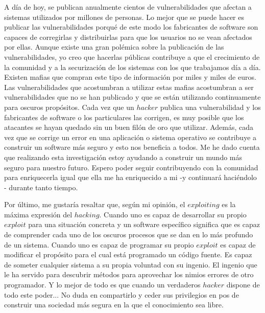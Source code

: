 \documentclass [titlepage, 12pt]{article}
\begin{document}
A d\'ia de hoy, se publican anualmente cientos de vulnerabilidades que afectan a sistemas utilizados por millones de personas. Lo mejor que se puede hacer es publicar las vulnerabilidades porqu\'e de este modo los fabricantes de software son capaces de corregirlas y distribuirlas para que los usuarios no se vean afectados por ellas. Aunque existe una gran pol\'emica sobre la publicaci\'on de las vulnerabilidades, yo creo que hacerlas p\'ublicas contribuye a que el crecimiento de la comunidad y a la securizaci\'on de los sistemas con los que trabajamos d\'ia a d\'ia.\\
Existen mafias que compran este tipo de informaci\'on por miles y miles de euros. Las vulnerabilidades que acostumbran a utilizar estas mafias acostumbran a ser vulnerabilidades que no se han publicado y que se est\'an utilizando continuamente para oscuros prop\'ositos. Cada vez que un $hacker$ publica una vulnerabilidad y los fabricantes de software o los particulares las corrigen, es muy posible que los atacantes se hayan quedado sin un buen fil\'on de oro que utilizar. Adem\'as, cada vez que se corrige un error en una aplicaci\'on o sistema operativo se contribuye a construir un software m\'as seguro y esto nos beneficia a todos. Me he dado cuenta que realizando esta investigaci\'on estoy ayudando a construir un mundo m\'as seguro para nuestro futuro. Espero poder seguir contribuyendo con la comunidad para enriquecerla igual que ella me ha enriquecido a mi -y continuar\'a haci\'endolo - durante tanto tiempo.\bigskip

Por \'ultimo, me gustar\'ia resaltar que, seg\'un mi opini\'on, el $exploiting$ es la m\'axima expresi\'on del $hacking$. Cuando uno es capaz de desarrollar su propio $exploit$  para una situaci\'on concreta y un software espec\'ifico significa que es capaz de comprender cada uno de los oscuros procesos que se dan en lo m\'as profundo de un sistema. Cuando uno es capaz de programar su propio $exploit$ es capaz de modificar el prop\'osito para el cual est\'a programado un c\'odigo fuente. Es capaz de someter cualquier sistema a su propia voluntad con su ingenio. El ingenio que le ha servido para descubrir m\'etodos para aprovechar los nimios errores de otro programador. Y lo mejor de todo es que cuando un verdaderos $hacker$ dispone de todo este poder... No duda en compartirlo y ceder sus privilegios en pos de construir una sociedad m\'as segura en la que el conocimiento sea libre.
\pagebreak
\end{document}
